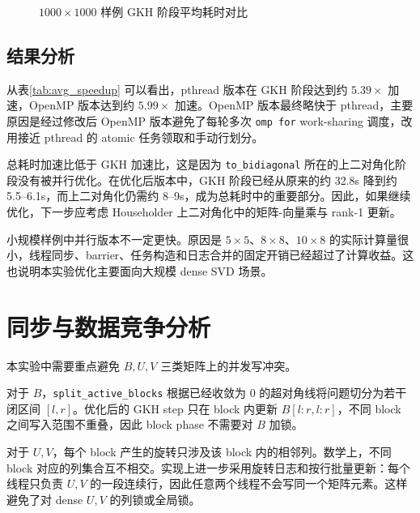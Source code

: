 ﻿\documentclass[UTF8,a4paper]{ctexart}
\begin{document}
\begin{figure}[H]
\centering
{}
\caption{$1000\times1000$ 样例 GKH 阶段平均耗时对比}
\end{figure}

\subsection{结果分析}

从表\ref{tab:avg_speedup} 可以看出，pthread 版本在 GKH 阶段达到约 $5.39\times$ 加速，OpenMP 版本达到约 $5.99\times$ 加速。OpenMP 版本最终略快于 pthread，主要原因是经过修改后 OpenMP 版本避免了每轮多次 \texttt{omp for} work-sharing 调度，改用接近 pthread 的 atomic 任务领取和手动行划分。

总耗时加速比低于 GKH 加速比，这是因为 \texttt{to\_bidiagonal} 所在的上二对角化阶段没有被并行优化。在优化后版本中，GKH 阶段已经从原来的约 32.8s 降到约 5.5--6.1s，而上二对角化仍需约 8--9s，成为总耗时中的重要部分。因此，如果继续优化，下一步应考虑 Householder 上二对角化中的矩阵-向量乘与 rank-1 更新。

小规模样例中并行版本不一定更快。原因是 $5\times5$、$8\times8$、$10\times8$ 的实际计算量很小，线程同步、barrier、任务构造和日志合并的固定开销已经超过了计算收益。这也说明本实验优化主要面向大规模 dense SVD 场景。

\section{同步与数据竞争分析}

本实验中需要重点避免 $B,U,V$ 三类矩阵上的并发写冲突。

对于 $B$，\texttt{split\_active\_blocks} 根据已经收敛为 0 的超对角线将问题切分为若干闭区间 $[l,r]$。优化后的 GKH step 只在 block 内更新 $B[l:r,l:r]$，不同 block 之间写入范围不重叠，因此 block phase 不需要对 $B$ 加锁。

对于 $U,V$，每个 block 产生的旋转只涉及该 block 内的相邻列。数学上，不同 block 对应的列集合互不相交。实现上进一步采用旋转日志和按行批量更新：每个线程只负责 $U,V$ 的一段连续行，因此任意两个线程不会写同一个矩阵元素。这样避免了对 dense $U,V$ 的列锁或全局锁。
\end{document}
